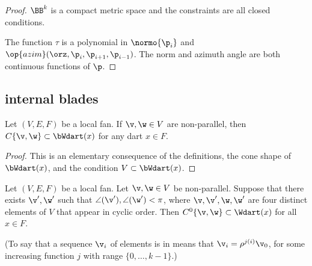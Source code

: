 \begin{proof} $\BB^k$ is a compact metric space and the constraints
are all closed conditions.

The function $\tau$ is a polynomial in $\normo{\p_i}$ and
$\op{azim}(\orz,\p_i,\p_{i+1},\p_{i-1})$.  The norm and azimuth
angle are both continuous functions of $\p$.
\end{proof}




\subsection{internal blades}


\begin{lemma}[] Let $(V,E,F)$ be a local fan.
If $\v,\w\in V$ are non-parallel, then $C\{\v,\w\} \subset
\bWdart(x)$ for any dart $x\in F$.
\end{lemma}
%

\begin{proof} This is an elementary consequence of the definitions,
the cone shape of $\bWdart(x)$, and the condition $V\subset
\bWdart(x)$.
\end{proof}


\begin{lemma} \label{lemma:internal}
Let $(V,E,F)$ be a local fan.  Let $\v,\w\in V$ be non-parallel.
Suppose that there exists $\v',\w'$ such that
$\angle(\v'),\angle(\w')<\pi$, where $\v,\v',\w,\w'$ are four
distinct elements of $V$ that appear in cyclic order.  Then
$C^0\{\v,\w\}\subset \Wdart(x)$ for all $x\in F$.
\end{lemma}
%
%
%

(To say that a sequence $\v_i$ of elements is in  means that $\v_i = \rho^{j (i)}\v_0$, for some increasing
function $j$ with range $\{0,\ldots,k-1\}$.)

